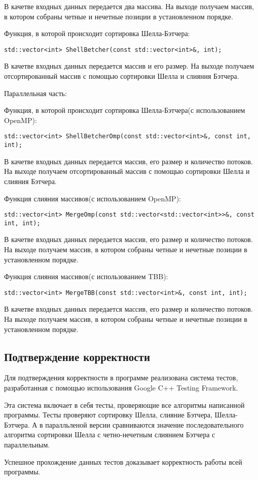 \documentclass{report}
\begin{document}
В качетве входных данных передается два массива. На выходе получаем массив, в котором собраны четные и нечетные позиции в установленном порядке.
\par Функция, в которой происходит сортировка Шелла-Бэтчера:
\begin{lstlisting}
std::vector<int> ShellBetcher(const std::vector<int>&, int);
\end{lstlisting}
В качетве входных данных передается массив и его размер. На выходе получаем отсортированный массив с помощью сортировки Шелла и слияния Бэтчера.
\par Параллельная часть:
\par Функция, в которой происходит сортировка Шелла-Бэтчера(с использованием OpenMP):
\begin{lstlisting}
std::vector<int> ShellBetcherOmp(const std::vector<int>&, const int, int);
\end{lstlisting}
В качетве входных данных передается массив, его размер и количество потоков. На выходе получаем отсортированный массив с помощью сортировки Шелла и слияния Бэтчера.
\par Функция слияния массивов(с использованием OpenMP):
\begin{lstlisting}
std::vector<int> MergeOmp(const std::vector<std::vector<int>>&, const int, int);
\end{lstlisting}
В качетве входных данных передается массив, его размер и количество потоков. На выходе получаем массив,  в котором собраны четные и нечетные позиции в установленном порядке.
\par Функция слияния массивов(с использованием TBB):
\begin{lstlisting}
std::vector<int> MergeTBB(const std::vector<int>&, const int, int);
\end{lstlisting}
В качетве входных данных передается массив, его размер и количество потоков. На выходе получаем массив,  в котором собраны четные и нечетные позиции в установленном порядке.
\newpage

\begin{center}
\section*{Подтверждение корректности}
\end{center}
\par Для подтверждения корректности в программе реализована система тестов, разработанная с помощью использования Google C++ Testing Framework.
\par Эта система включает в себя тесты, проверяющие все алгоритмы написанной программы. Тесты проверяют сортировку Шелла, слияние Бэтчера, Шелла-Бэтчера. А в паралльленой версии сравниваются значение последовательного алгоритма сортировки Шелла с четно-нечетным слиянием Бэтчера с параллельным.
\par Успешное прохождение данных тестов доказывает корректность работы всей программы.
\newpage
\end{document}
